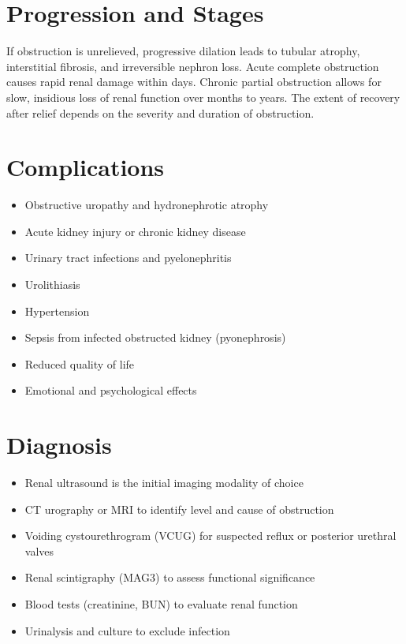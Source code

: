 \section{Progression and Stages}
If obstruction is unrelieved, progressive dilation leads to tubular atrophy, interstitial fibrosis, and irreversible nephron loss. Acute complete obstruction causes rapid renal damage within days. Chronic partial obstruction allows for slow, insidious loss of renal function over months to years. The extent of recovery after relief depends on the severity and duration of obstruction.

\section{Complications}

\begin{itemize}[noitemsep]
  \item Obstructive uropathy and hydronephrotic atrophy
  \item Acute kidney injury or chronic kidney disease
  \item Urinary tract infections and pyelonephritis
  \item Urolithiasis
  \item Hypertension
  \item Sepsis from infected obstructed kidney (pyonephrosis)
  \item Reduced quality of life
  \item Emotional and psychological effects
\end{itemize}

\section{Diagnosis}

\begin{itemize}[noitemsep]
  \item Renal ultrasound is the initial imaging modality of choice
  \item CT urography or MRI to identify level and cause of obstruction
  \item Voiding cystourethrogram (VCUG) for suspected reflux or posterior urethral valves
  \item Renal scintigraphy (MAG3) to assess functional significance
  \item Blood tests (creatinine, BUN) to evaluate renal function
  \item Urinalysis and culture to exclude infection
\end{itemize}

